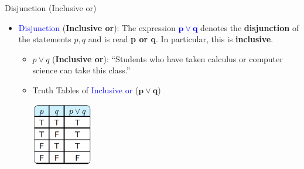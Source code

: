 \documentclass[aspectratio=169]{beamer}
\providecommand{\Blue}[1]{\textcolor{blue}{#1}}
\begin{document}
\begin{frame}[plain]{Disjunction (Inclusive or)}

\begin{itemize}[<+->]
 \item \Blue{Disjunction} ({\bf Inclusive or}): The expression \Blue{$\mathbf{p\vee q}$} denotes the {\bf disjunction}
   of the statements $p, q$ and is read {\bf p or q}. In particular, this is {\bf inclusive}.
   \begin{itemize}
      \item $p\vee q$ ({\bf Inclusive or}): ``Students who have taken calculus or computer science can
            take this class.''
      \item Truth Tables of \Blue{Inclusive or} ($\mathbf{p\vee q}$)       
          \smallskip
          
              \begin{center}
                \includegraphics[height=2.7cm]{./img/lecture11-fig4.png}
              \end{center}  
        \end{itemize}
    \end{itemize}
\end{frame}
\end{document}
